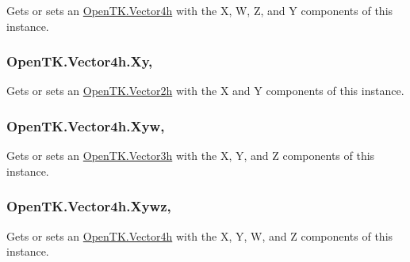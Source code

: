 Gets or sets an \hyperlink{struct_open_t_k_1_1_vector4h}{Open\-T\-K.\-Vector4h} with the X, W, Z, and Y components of this instance. 

\hypertarget{struct_open_t_k_1_1_vector4h_a1661594d8cb9fb720a0beab03d931b07}{
\subsubsection[{Xy}]{ Open\-T\-K.\-Vector4h.\-Xy\hspace{0.3cm}{\ttfamily [get]}, {\ttfamily [set]}}}\label{struct_open_t_k_1_1_vector4h_a1661594d8cb9fb720a0beab03d931b07}


Gets or sets an \hyperlink{struct_open_t_k_1_1_vector2h}{Open\-T\-K.\-Vector2h} with the X and Y components of this instance. 

\hypertarget{struct_open_t_k_1_1_vector4h_aa7eb6db0dab25664135033c0d606dee9}{
\subsubsection[{Xyw}]{ Open\-T\-K.\-Vector4h.\-Xyw\hspace{0.3cm}{\ttfamily [get]}, {\ttfamily [set]}}}\label{struct_open_t_k_1_1_vector4h_aa7eb6db0dab25664135033c0d606dee9}


Gets or sets an \hyperlink{struct_open_t_k_1_1_vector3h}{Open\-T\-K.\-Vector3h} with the X, Y, and Z components of this instance. 

\hypertarget{struct_open_t_k_1_1_vector4h_abd906c0858b365e57aa80a1a334a9776}{
\subsubsection[{Xywz}]{ Open\-T\-K.\-Vector4h.\-Xywz\hspace{0.3cm}{\ttfamily [get]}, {\ttfamily [set]}}}\label{struct_open_t_k_1_1_vector4h_abd906c0858b365e57aa80a1a334a9776}


Gets or sets an \hyperlink{struct_open_t_k_1_1_vector4h}{Open\-T\-K.\-Vector4h} with the X, Y, W, and Z components of this instance. 

